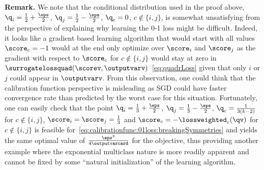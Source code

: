 \documentclass{article}
\begin{document}
\textbf{Remark.} We note that the conditional distribution used in the proof above, $\q_i = \frac12 + \frac{\eps}{2}$,  $\q_j = \frac12 - \frac{\eps}{2}$, $\q_c = 0$, $c\not\in\{i, j\}$, is somewhat unsatisfying from the perspective of explaining why learning the 0-1 loss might be difficult. Indeed, it looks like a gradient based learning algorithm that would start with all values $\score_c = -1$ would at the end only optimize over $\score_i$ and $\score_j$ as the gradient with respect to $\score_c$ for $c \notin \{i,j\}$ would stay at zero in~$\surrogatelossquad( \scorev, \outputvarv )$~\eqref{eq:quadrLoss} given that only $i$ or $j$ could appear in $\outputvarv$. 
From this observation, one could think that the calibration function perspective is misleading as SGD could have faster convergence rate than predicted by the worst case for this situation.
Fortunately, one can easily check that the point $\q_i = \frac13 + \frac{\eps}{2}$,  $\q_j = \frac13 - \frac{\eps}{2}$, $\q_c = \frac{1}{3(k-2)}$ for  $c\not\in\{i, j\}$, $\score_i = \score_j = \frac{1}{3}$ and $\score_c = -\lossweighted_c(\qv)$ for $c\not\in\{i, j\}$ is feasible for~\eqref{eq:calibrationfunc:01loss:breakingSymmetries} and yields the same optimal value of $\frac{\eps^2}{4\outputvarcard}$ for the objective, thus providing another example where the exponential multiclass nature is more readily apparent and cannot be fixed by some ``natural initialization'' of the learning algorithm.
\end{document}
